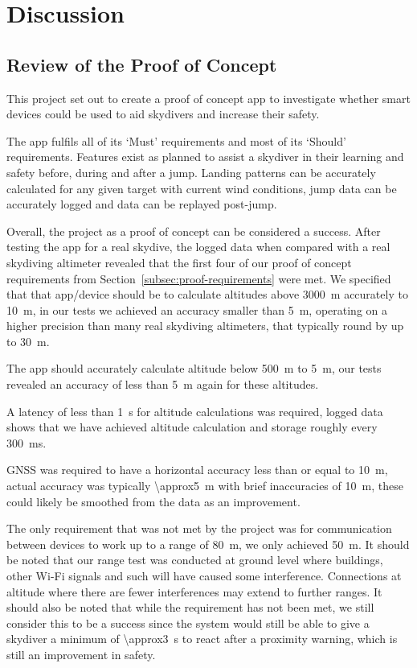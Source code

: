 \section{Discussion}\label{sec:discussion}

\subsection{Review of the Proof of Concept}
This project set out to create a proof of concept app to investigate whether smart devices could be used to aid skydivers and increase their safety.

The app fulfils all of its `Must' requirements and most of its `Should' requirements.
Features exist as planned to assist a skydiver in their learning and safety before, during and after a jump. Landing patterns can be accurately calculated for any given target with current wind conditions, jump data can be accurately logged and data can be replayed post-jump.

Overall, the project as a proof of concept can be considered a success. After testing the app for a real skydive, the logged data when compared with a real skydiving altimeter revealed that the first four of our proof of concept requirements from Section~\ref{subsec:proof-requirements} were met. We specified that that app/device should be to calculate altitudes above \SI{3000}{\metre} accurately to \SI{10}{\metre}, in our tests we achieved an accuracy smaller than \SI{5}{\metre}, operating on a higher precision than many real skydiving altimeters, that typically round by up to \SI{30}{\metre}.

The app should accurately calculate altitude below \SI{500}{\metre} to \SI{5}{\metre}, our tests revealed an accuracy of less than \SI{5}{\metre} again for these altitudes.

A latency of less than \SI{1}{\second} for altitude calculations was required, logged data shows that we have achieved altitude calculation and storage roughly every \SI{300}{\milli\second}.

GNSS was required to have a horizontal accuracy less than or equal to \SI{10}{\metre}, actual accuracy was typically \SI{\approx5}{\metre} with brief inaccuracies of \SI{10}{\metre}, these could likely be smoothed from the data as an improvement.

The only requirement that was not met by the project was for communication between devices to work up to a range of \SI{80}{\metre}, we only achieved \SI{50}{\metre}. It should be noted that our range test was conducted at ground level where buildings, other Wi-Fi signals and such will have caused some interference. Connections at altitude where there are fewer interferences may extend to further ranges. It should also be noted that while the requirement has not been met, we still consider this to be a success since the system would still be able to give a skydiver a minimum of \SI{\approx3}{\second} to react after a proximity warning, which is still an improvement in safety.

